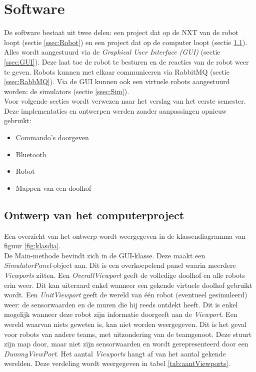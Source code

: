 \documentclass[tt1]{penoverslag}
\begin{document}
\section{Software}
\label{secc:softw}
De software bestaat uit twee delen: een project dat op de NXT van de robot loopt (sectie \ref{ssec:Robot}) en een project dat op de computer loopt (sectie \ref{ssec:Sdesign}). Alles wordt aangestuurd via de \textit{Graphical User Interface (GUI)} (sectie \ref{ssec:GUI}). Deze laat toe de robot te besturen en de reacties van de robot weer te geven. Robots kunnen met elkaar communiceren via RabbitMQ (sectie \ref{ssec:RabbMQ}). Via de GUI kunnen ook een virtuele robots aangestuurd worden: de simulators (sectie \ref{ssec:Sim}).\\

Voor volgende secties wordt verwezen naar het verslag van het eerste semester. Deze implementaties en ontwerpen werden zonder aanpassingen opnieuw gebruikt:

\begin{itemize}
\item Commando's doorgeven
\item Bluetooth
\item Robot
\item Mappen van een doolhof
\end{itemize}

\subsection{Ontwerp van het computerproject}
\label{ssec:Sdesign}
Een overzicht van het ontwerp wordt weergegeven in de klassendiagramma van figuur \ref{fig:klasdia}.\\

De Main-methode bevindt zich in de GUI-klasse. Deze maakt een \textit{SimulatorPanel}-object aan. Dit is een overkoepelend panel waarin meerdere \textit{Viewports} zitten. Een \textit{OverallViewport} geeft de volledige doolhof en alle robots erin weer. Dit kan uiteraard enkel wanneer een gekende virtuele doolhof gebruikt wordt. Een \textit{UnitViewport} geeft de wereld van \'e\'en robot (eventueel gesimuleerd) weer: de sensorwaarden en de muren die hij reeds ontdekt heeft. Dit is enkel mogelijk wanneer deze robot zijn informatie doorgeeft aan de \textit{Viewport}. Een wereld waarvan niets geweten is, kan niet worden weergegeven. Dit is het geval voor robots van andere teams, met uitzondering van de teamgenoot. Deze stuurt zijn map door, maar niet zijn sensorwaarden en wordt gerepresenteerd door een \textit{DummyViewPort}. Het aantal \textit{Viewports} hangt af van het aantal gekende werelden. Deze verdeling wordt weergegeven in tabel \ref{tab:aantViewports}.\\
\end{document}
